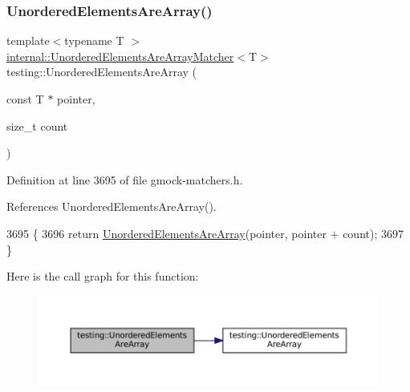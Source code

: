 \subsubsection{\texorpdfstring{Unordered\+Elements\+Are\+Array()}{UnorderedElementsAreArray()}\hspace{0.1cm}{\footnotesize\ttfamily [2/4]}}
{\footnotesize\ttfamily template$<$typename T $>$ \\
\hyperlink{classtesting_1_1internal_1_1UnorderedElementsAreArrayMatcher}{internal\+::\+Unordered\+Elements\+Are\+Array\+Matcher}$<$T$>$ testing\+::\+Unordered\+Elements\+Are\+Array (\begin{DoxyParamCaption}\item[{const T $\ast$}]{pointer,  }\item[{size\+\_\+t}]{count }\end{DoxyParamCaption})\hspace{0.3cm}{\ttfamily [inline]}}



Definition at line 3695 of file gmock-\/matchers.\+h.



References Unordered\+Elements\+Are\+Array().


\begin{DoxyCode}
3695                                                           \{
3696   \textcolor{keywordflow}{return} \hyperlink{namespacetesting_a72b0ee2217293106fcf4971dc4a59f4c}{UnorderedElementsAreArray}(pointer, pointer + count);
3697 \}
\end{DoxyCode}
Here is the call graph for this function\+:
\nopagebreak
\begin{figure}[H]
\begin{center}
\leavevmode
\includegraphics[width=350pt]{namespacetesting_a99b9509a7cd405be28bf45231577384b_cgraph}
\end{center}
\end{figure}
\mbox{\label{namespacetesting_a23c7729cfc61967f3271018076c4b724}} 
